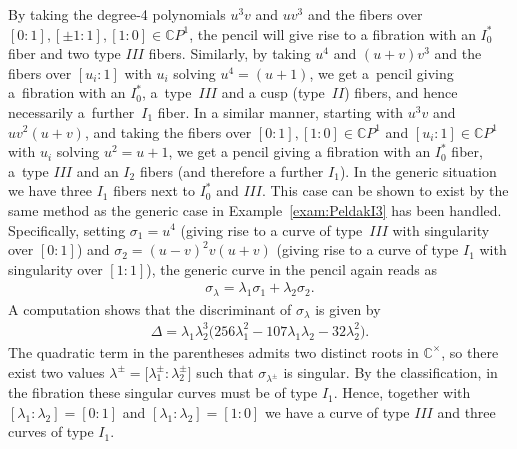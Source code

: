 \documentclass[10pt,a4paper]{amsart}
\newcommand{\C}{{\mathbb C}} %
\newcommand{\CP}[1]{\mathbb{C}P^{#1}} %
\numberwithin{equation}{section}
\begin{document}
\begin{Example}
By taking the degree-4 polynomials $u^3v$ and $uv^3$ and the fibers over $[0:1], [\pm 1 :1], [1:0]\allowbreak \in \CP{1}$, the pencil will give rise to a fibration with an $I_0^*$ fiber and two type $III$ fibers. Similarly, by taking $u^4$ and $(u+v)v^3$ and the fibers over $[u_i:1]$ with $u_i$ solving $u^4=(u+1)$, we get a~pencil giving a~fibration with an $I_0^*$, a~type~$III$ and a cusp (type~$II$) fibers, and hence necessarily a~further~$I_1$ fiber. In a similar manner, starting with $u^3v$ and $uv^2(u+v)$, and taking the fibers over $[0:1], [1:0]\in \CP{1}$ and $[u_i:1]\in \CP{1}$ with $u_i$ solving $u^2=u+1$, we get a pencil giving a fibration with an $I_0^*$ fiber, a~type $III$ and an $I_2$ fibers (and therefore a further $I_1$). In the generic situation we have three $I_1$ fibers next to $I_0^*$ and $III$. This case can be shown to exist by the same method as the generic case in Example~\ref{exam:PeldakI3} has been handled. Specifically, setting $\sigma_1 = u^4$ (giving rise to a curve of type~$III$ with singularity over $[0:1]$) and $\sigma_2 = (u-v)^2 v (u+v)$ (giving rise to a curve of type $I_1$ with singularity over $[1:1]$), the generic curve in the pencil again reads as
\begin{gather*}
 \sigma_{\lambda} = \lambda_1 \sigma_1 + \lambda_2 \sigma_2.
\end{gather*}
A computation shows that the discriminant of $\sigma_{\lambda}$ is given by
\begin{gather*}
 \Delta = \lambda_1 \lambda_2^3 \big(256 \lambda_1^2 - 107 \lambda_1 \lambda_2 - 32 \lambda_2^2 \big).
\end{gather*}
The quadratic term in the parentheses admits two distinct roots in $\C^{\times}$, so there exist two values $\lambda^{\pm} = \big[\lambda_1^{\pm} : \lambda_2^{\pm}\big]$ such that $\sigma_{\lambda^{\pm}}$ is singular. By the classification, in the fibration these singular curves must be of type $I_1$. Hence, together with $[\lambda_1 : \lambda_2] = [0:1]$ and $[\lambda_1 : \lambda_2] = [1:0]$ we have a curve of type $III$ and three curves of type $I_1$.
\end{Example}
\end{document}
